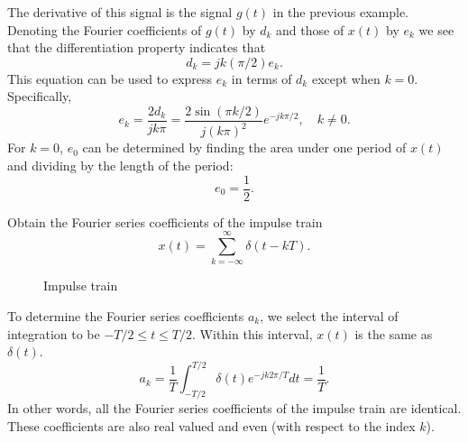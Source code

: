 \begin{frame}
{
    The derivative of this signal is the signal $g(t)$ in the previous example. Denoting the Fourier coefficients of $g(t)$ by $d_k$ and those of $x(t)$ by $e_k$ we see that the \alert{differentiation property}  indicates that
    \pause
    \begin{equation*}
        d_k = jk(\pi/2)e_k.
    \end{equation*}
    This equation can be used to express $e_k$ in terms of $d_k$ except when $k = 0$. Specifically,
    \pause
    \begin{equation*}
        e_k = \frac{2d_k}{jk\pi} = \frac{2\sin(\pi k/2)}{j(k\pi)^2}e^{-jk\pi/2}, \quad k \neq 0.
    \end{equation*}
    For $k = 0$, $e_0$ can be determined by finding the area under one period of $x(t)$ and dividing by the length of the period:
    \pause
    \begin{equation*}
        e_0 = \frac{1}{2}.
    \end{equation*}
}
\end{frame}

\begin{frame}%
    \begin{example}
        Obtain the Fourier series coefficients of the impulse train
        \begin{equation}\label{eq:impulsetrain}
            x(t) = \sum_{k=-\infty}^{\infty} \delta(t-kT).
        \end{equation}
    \end{example}
    \begin{figure}
      \centering
      
      \caption{Impulse train}\label{fi:impulse_train}
    \end{figure}

\end{frame}

\begin{frame}
{
    To determine the Fourier series coefficients $a_k$, we select the interval of integration to be $-T/2 \leq t \leq T/2$. Within this interval, $x(t)$ is the same as $\delta(t)$.
    \pause
    \begin{equation*}
        a_k = \frac{1}{T}\int_{-T/2}^{T/2}\delta(t)e^{-jk 2\pi/T}dt = \frac{1}{T}.
    \end{equation*}
    \pause
    In other words, all the Fourier series coefficients of the impulse train are identical. These coefficients are also real valued and even (with respect to the index $k$).
}
\end{frame}


